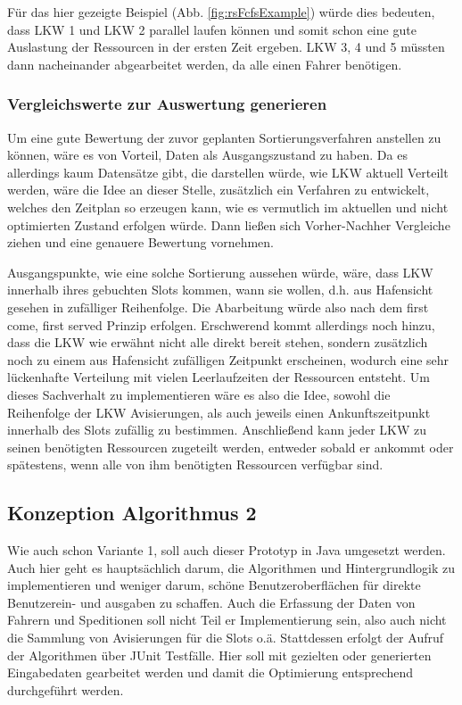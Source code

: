 Für das hier gezeigte Beispiel (Abb. \ref{fig:rsFcfsExample}) würde dies bedeuten, dass LKW 1 und LKW 2 parallel laufen können und somit schon eine gute Auslastung der Ressourcen in der ersten Zeit ergeben. LKW 3, 4 und 5 müssten dann nacheinander abgearbeitet werden, da alle einen Fahrer benötigen.




\subsubsection{Vergleichswerte zur Auswertung generieren}

Um eine gute Bewertung der zuvor geplanten Sortierungsverfahren anstellen zu können, wäre es von Vorteil, Daten als Ausgangszustand zu haben. Da es allerdings kaum Datensätze gibt, die darstellen würde, wie LKW aktuell Verteilt werden, wäre die Idee an dieser Stelle, zusätzlich ein Verfahren zu entwickelt, welches den Zeitplan so erzeugen kann, wie es vermutlich im aktuellen und nicht optimierten Zustand erfolgen würde. Dann ließen sich Vorher-Nachher Vergleiche ziehen und eine genauere Bewertung vornehmen.

Ausgangspunkte, wie eine solche Sortierung aussehen würde, wäre, dass LKW innerhalb ihres gebuchten Slots kommen, wann sie wollen, d.h. aus Hafensicht gesehen in zufälliger Reihenfolge. Die Abarbeitung würde also nach dem \glqq{}first come, first served\grqq{} Prinzip erfolgen. Erschwerend kommt allerdings noch hinzu, dass die LKW wie erwähnt nicht alle direkt bereit stehen, sondern zusätzlich noch zu einem aus Hafensicht zufälligen Zeitpunkt erscheinen, wodurch eine sehr lückenhafte Verteilung mit vielen Leerlaufzeiten der Ressourcen entsteht. Um dieses Sachverhalt zu implementieren wäre es also die Idee, sowohl die Reihenfolge der LKW Avisierungen, als auch jeweils einen Ankunftszeitpunkt innerhalb des Slots zufällig zu bestimmen. Anschließend kann jeder LKW zu seinen benötigten Ressourcen zugeteilt werden, entweder sobald er ankommt oder spätestens, wenn alle von ihm benötigten Ressourcen verfügbar sind. 


\subsection{Konzeption Algorithmus 2}

Wie auch schon Variante 1, soll auch dieser Prototyp in Java umgesetzt werden. Auch hier geht es hauptsächlich darum, die Algorithmen und Hintergrundlogik zu implementieren und weniger darum, schöne Benutzeroberflächen für direkte Benutzerein- und ausgaben zu schaffen. Auch die Erfassung der Daten von Fahrern und Speditionen soll nicht Teil er Implementierung sein, also auch nicht die Sammlung von Avisierungen für die Slots o.ä. Stattdessen erfolgt der Aufruf der Algorithmen über JUnit Testfälle. Hier soll mit gezielten oder generierten Eingabedaten gearbeitet werden und damit die Optimierung entsprechend durchgeführt werden.

